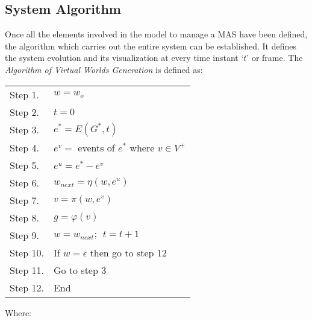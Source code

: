 \documentclass[runningheads]{llncs}
\begin{document}
\subsection{System Algorithm
\label{sec:system_algorithm}}


Once all the elements involved in the model to manage a MAS have been defined, the algorithm which carries out the
entire system can be established. It defines the system evolution and its visualization at every
time instant `$t$' or frame. The \textit{Algorithm of Virtual Worlds Generation} is defined as:

		
\begin{center}
\begin{tabular}{|ll|}
    \hline

    Step 1. & $w = w_o$ \\

    Step 2. & $t = 0$ \\

    Step 3. & $e^* = E(G^*, t)$ \\

    Step 4. & $e^v =$ events of $e^*$ where $v \in V^+$ \\

    Step 5. & $e^u = e^* - e^v$ \\

    Step 6. & $w_{next} = \eta(w, e^u)$ \\

    Step 7. & $v =  \pi(w, e^v)$ \\

    Step 8. & $g = \varphi(v)$ \\

    Step 9. & $w = w_{next}; \ \ t = t + 1$ \\

    Step 10. & If $w = \epsilon$ then go to step 12 \\

    Step 11. & Go to step 3 \\

    Step 12. & End \\

    \hline
\end{tabular}
\end{center}


Where:
\end{document}
